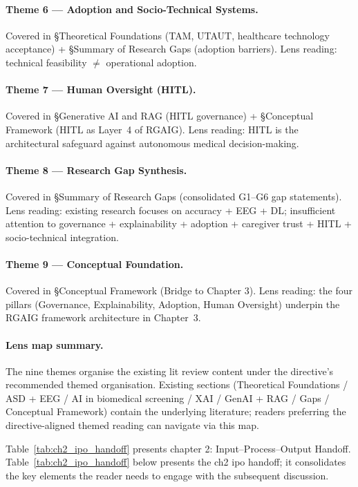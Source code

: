 \paragraph{Theme 6 --- Adoption and Socio-Technical Systems.} Covered in §Theoretical Foundations (TAM, UTAUT, healthcare technology acceptance) + §Summary of Research Gaps (adoption barriers). Lens reading: technical feasibility $\neq$ operational adoption.

\paragraph{Theme 7 --- Human Oversight (HITL).} Covered in §Generative AI and RAG (HITL governance) + §Conceptual Framework (HITL as Layer~4 of RGAIG). Lens reading: HITL is the architectural safeguard against autonomous medical decision-making.

\paragraph{Theme 8 --- Research Gap Synthesis.} Covered in §Summary of Research Gaps (consolidated G1--G6 gap statements). Lens reading: existing research focuses on accuracy + EEG + DL; insufficient attention to governance + explainability + adoption + caregiver trust + HITL + socio-technical integration.

\paragraph{Theme 9 --- Conceptual Foundation.} Covered in §Conceptual Framework (Bridge to Chapter 3). Lens reading: the four pillars (Governance, Explainability, Adoption, Human Oversight) underpin the RGAIG framework architecture in Chapter~3.

\paragraph{Lens map summary.} The nine themes organise the existing lit review content under the directive's recommended themed organisation. Existing sections (Theoretical Foundations / ASD + EEG / AI in biomedical screening / XAI / GenAI + RAG / Gaps / Conceptual Framework) contain the underlying literature; readers preferring the directive-aligned themed reading can navigate via this map.

\noindent Table~\ref{tab:ch2_ipo_handoff} presents chapter 2: Input--Process--Output Handoff.
\noindent Table~\ref{tab:ch2_ipo_handoff} below presents the ch2 ipo handoff; it consolidates the key elements the reader needs to engage with the subsequent discussion.


